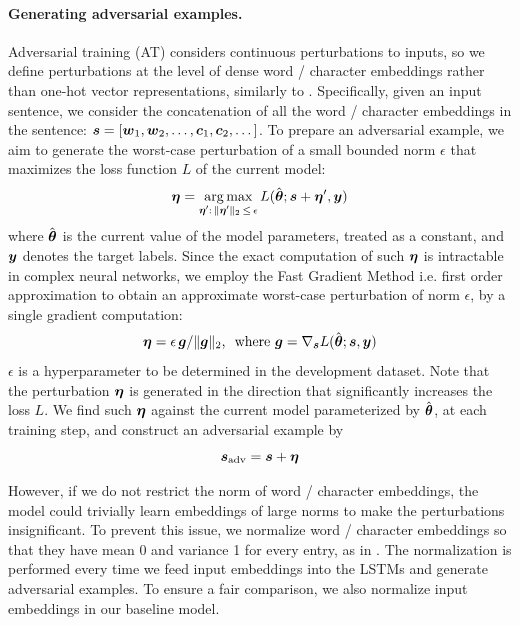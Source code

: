 \documentclass[11pt,a4paper]{article}
\DeclareMathOperator*{\argmax}{arg\,max}
\newcommand{\veci}[1]{\mbox{\boldmath $#1$}}
\begin{document}
\paragraph{Generating adversarial examples.}

Adversarial training (AT) considers continuous perturbations to inputs, so
we define perturbations at the level of dense word / character embeddings rather than one-hot vector representations, similarly to .
Specifically, given an input sentence,
we consider the concatenation of all the word \!/\! character embeddings in the sentence: 
$\veci{s} = [\veci{w}_1, \veci{w}_2, \dots, \veci{c}_1, \veci{c}_2, \dots]$.
To prepare an adversarial example, we aim to generate the worst-case perturbation of a small bounded norm $\epsilon$ that maximizes the loss function $L$ of the current model:
\begin{equation*}
\veci{\eta} = \argmax_{
\scalebox{0.75}{$\veci{\eta}'$}:\,
\Vert\scalebox{0.75}{$\veci{\eta}'$}\Vert_2\,
\leq \,\epsilon }
L(\hat{\veci{\theta}}; \veci{s}\!\!~ + \!\!~\veci{\eta}', \veci{y})
\end{equation*}
where $\hat{\veci{\theta}}$ is the current value of the model parameters, treated as a constant, and $\veci{y}$ denotes the target labels.
Since the exact computation of such $\veci{\eta}$ is intractable in complex neural networks, we employ the Fast Gradient Method \cite{liu2017delving,miyato2017adv} i.e. first order approximation to obtain an approximate worst-case perturbation of norm $\epsilon$, by a single gradient computation:%
\begin{equation}
\label{eq:perturb}
\veci{\eta} = \epsilon\, \veci{g}/ \Vert\veci{g}\Vert_2
\mbox{, ~where }  \veci{g} = \nabla_{\scalebox{0.8}{$\veci{s}$}} L(\hat{\veci{\theta}}; \veci{s}, \veci{y})
\end{equation}
$\epsilon$ is a hyperparameter to be determined in the development dataset.
Note that the perturbation $\veci{\eta}$ is generated in the direction that significantly increases the loss $L$.
We find such $\veci{\eta}$ against the current model parameterized by $\hat{\veci{\theta}}$, at each training step, and construct an adversarial example by\vspace{-1mm}
$$\veci{s}_{\mathrm{adv}} = \veci{s} + \veci{\eta} \vspace{-1.5mm}$$

However,
if we do not restrict the norm of word \!/\! character embeddings,
the model could trivially learn embeddings of large norms to make the perturbations insignificant.
To prevent this issue, we normalize word \!/\! character embeddings so that they have mean 0 and variance 1 for every entry, as in .
The normalization is performed  every time we feed input embeddings into the LSTMs and generate adversarial examples.
To ensure a fair comparison, %
we also normalize input embeddings in our baseline model.
\end{document}
